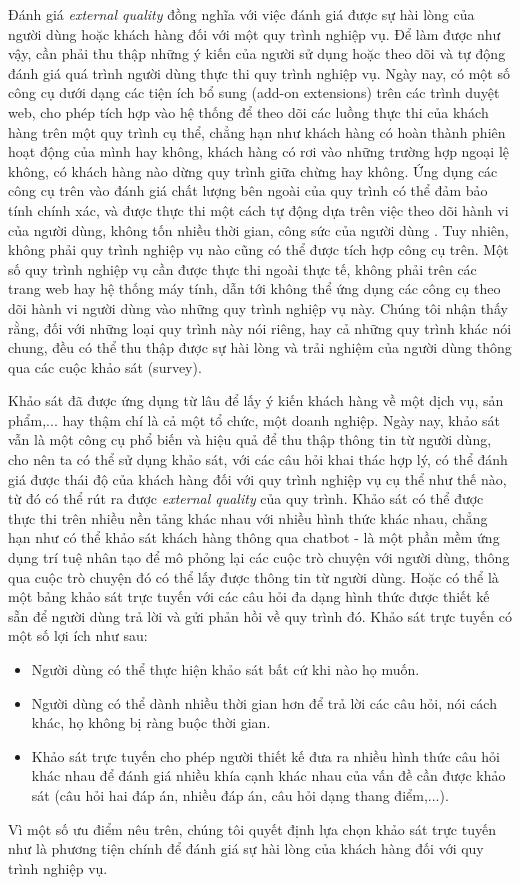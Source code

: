 Đánh giá \emph{external quality} đồng nghĩa với việc đánh giá được sự hài lòng của người dùng hoặc khách hàng đối với một quy trình nghiệp vụ. Để làm được như vậy, cần phải thu thập những ý kiến của người sử dụng hoặc theo dõi và tự động đánh giá quá trình người dùng thực thi quy trình nghiệp vụ. Ngày nay, có một số công cụ dưới dạng các tiện ích bổ sung (add-on extensions) trên các trình duyệt web, cho phép tích hợp vào hệ thống để theo dõi các luồng thực thi của khách hàng trên một quy trình cụ thể, chẳng hạn như khách hàng có hoàn thành phiên hoạt động của mình hay không, khách hàng có rơi vào những trường hợp ngoại lệ không, có khách hàng nào dừng quy trình giữa chừng hay không.
Ứng dụng các công cụ trên vào đánh giá chất lượng bên ngoài của quy trình có thể đảm bảo tính chính xác, và được thực thi một cách tự động dựa trên việc theo dõi hành vi của người dùng, không tốn nhiều thời gian, công sức của người dùng . Tuy nhiên, không phải quy trình nghiệp vụ nào cũng có thể được tích hợp công cụ trên. Một số quy trình nghiệp vụ cần được thực thi ngoài thực tế, không phải trên các trang web hay hệ thống máy tính, dẫn tới không thể ứng dụng các công cụ theo dõi hành vi người dùng vào những quy trình nghiệp vụ này. Chúng tôi nhận thấy rằng, đối với những loại quy trình này nói riêng, hay cả những quy trình khác nói chung, đều có thể thu thập được sự hài lòng và trải nghiệm của người dùng thông qua các cuộc khảo sát (survey).
\par
Khảo sát đã được ứng dụng từ lâu để lấy ý kiến khách hàng về một dịch vụ, sản phẩm,... hay thậm chí là cả một tổ chức, một doanh nghiệp. Ngày nay, khảo sát vẫn là một công cụ phổ biến và hiệu quả để thu thập thông tin từ người dùng, cho nên ta có thể sử dụng khảo sát, với các câu hỏi khai thác hợp lý, có thể đánh giá được thái độ của khách hàng đối với quy trình nghiệp vụ cụ thể như thế nào, từ đó có thể rút ra được \emph{external quality} của quy trình. Khảo sát có thể được thực thi trên nhiều nền tảng khác nhau với nhiều hình thức khác nhau, chẳng hạn như có thể khảo sát khách hàng thông qua chatbot - là một phần mềm ứng dụng trí tuệ nhân tạo để mô phỏng lại các cuộc trò chuyện với người dùng, thông qua cuộc trò chuyện đó có thể lấy được thông tin từ người dùng. Hoặc có thể là một bảng khảo sát trực tuyến với các câu hỏi đa dạng hình thức được thiết kế sẵn để người dùng trả lời và gửi phản hồi về quy trình đó. Khảo sát trực tuyến có một số lợi ích như sau:
\begin{itemize}
    \item Người dùng có thể thực hiện khảo sát bất cứ khi nào họ muốn.
    \item Người dùng có thể dành nhiều thời gian hơn để trả lời các câu hỏi, nói cách khác, họ không bị ràng buộc thời gian.
    \item Khảo sát trực tuyến cho phép người thiết kế đưa ra nhiều hình thức câu hỏi khác nhau để đánh giá nhiều khía cạnh khác nhau của vấn đề cần được khảo sát (câu hỏi hai đáp án, nhiều đáp án, câu hỏi dạng thang điểm,...).
\end{itemize}
\par
Vì một số ưu điểm nêu trên, chúng tôi quyết định lựa chọn khảo sát trực tuyến như là phương tiện chính để đánh giá sự hài lòng của khách hàng đối với quy trình nghiệp vụ.